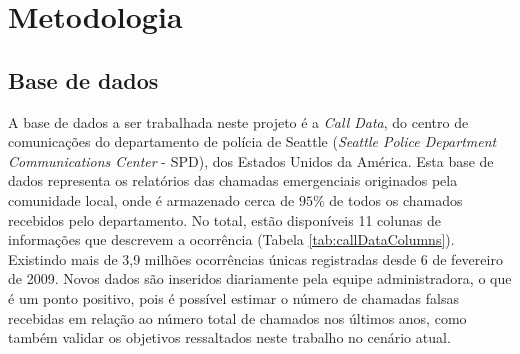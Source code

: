 \chapter{Metodologia}

\section{Base de dados}
A base de dados a ser trabalhada neste projeto é a \textit{Call Data}, do centro de comunicações do departamento de polícia de Seattle (\textit{Seattle Police Department Communications Center} - SPD), dos Estados Unidos da América. Esta base de dados representa os relatórios das chamadas emergenciais originados pela comunidade local, onde é armazenado cerca de $95\%$ de todos os chamados recebidos pelo departamento. No total, estão disponíveis 11 colunas de informações que descrevem a ocorrência (Tabela \ref{tab:callDataColumns}). Existindo mais de 3,9 milhões ocorrências únicas registradas desde 6 de fevereiro de 2009. Novos dados são inseridos diariamente pela equipe administradora, o que é um ponto positivo, pois é possível estimar o número de chamadas falsas recebidas em relação ao número total de chamados nos últimos anos, como também validar os objetivos ressaltados neste trabalho no cenário atual.

